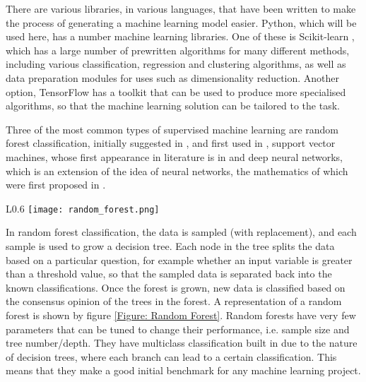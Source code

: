 \documentclass[12pt]{report}
\begin{document}
		There are various libraries, in various languages, that have been written to make the process of generating a machine learning model easier.  Python, which will be used here, has a number machine learning libraries.  One of these is Scikit-learn \citep{RefWorks:doc:5d80f150e4b07f40b9eab2f8}, which has a large number of prewritten algorithms for many different methods, including various classification, regression and clustering algorithms, as well as data preparation modules for uses such as dimensionality reduction.  Another option, TensorFlow \citep{RefWorks:doc:5d80f20de4b08a779635c81d} has a toolkit that can be used to produce more specialised algorithms, so that the machine learning solution can be tailored to the task. %
		
		Three of the most common types of supervised machine learning are random forest classification, initially suggested in \cite{RefWorks:doc:5d84b84de4b03ee47d60013e}, and first used in \cite{RefWorks:doc:5d84b954e4b01cdccc094821}, support vector machines, whose first appearance in literature is in \cite{RefWorks:doc:5d84bca0e4b074abc390dc95} and deep neural networks, which is an extension of the idea of neural networks, the mathematics of which were first proposed in \cite{RefWorks:doc:5d84d2d4e4b048bf85a1aa0a}.  

		\begin{wrapfigure}{L}{0.6\textwidth}
			\centering
			\texttt{[image: random\_forest.png]}
			\caption{A simple illustration of a random forest, showing how each of a number (n) of samples makes a tree that contributes to the consensus that will be reported}
			\label{Figure: Random Forest}
		\end{wrapfigure}
		
		In random forest classification, the data is sampled (with replacement), and each sample is used to grow a decision tree.  Each node in the tree splits the data based on a particular question, for example whether an input variable is greater than a threshold value, so that the sampled data is separated back into the known classifications.  Once the forest is grown, new data is classified based on the consensus opinion of the trees in the forest.  A representation of a random forest is shown by figure \ref{Figure: Random Forest}.  Random forests have very few parameters that can be tuned to change their performance, i.e. sample size and tree number/depth.  They have multiclass classification built in due to the nature of decision trees, where each branch can lead to a certain classification.  This means that they make a good initial benchmark for any machine learning project.
		
\end{document}
